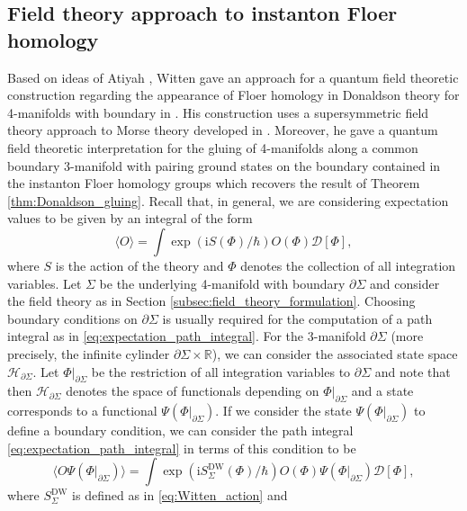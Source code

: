 \documentclass[11pt,colorinlistoftodos]{amsart}
\numberwithin{equation}{subsection}
\theoremstyle{plain}
\theoremstyle{definition}
\theoremstyle{remark}
\newcommand{\R}{\mathbb{R}}
\newcommand{\de}{\partial}
\newcommand{\calH}{\mathcal{H}}
\newcommand{\I}{\mathrm{i}}
\begin{document}
\subsection{Field theory approach to instanton Floer homology}
\label{subsec:field_theory_approach_to_floer_homology}
Based on ideas of Atiyah \cite{Atiyah1987}, Witten gave an approach for a quantum field theoretic construction regarding the appearance of Floer homology in Donaldson theory for 4-manifolds with boundary in \cite{Witten1988a}. His construction uses a supersymmetric field theory approach to Morse theory developed in \cite{Witten1982}. Moreover, he gave a quantum field theoretic interpretation for the gluing of 4-manifolds along a common boundary 3-manifold with pairing ground states on the boundary contained in the instanton Floer homology groups which recovers the result of Theorem \ref{thm:Donaldson_gluing}. 
Recall that, in general, we are considering expectation values to be given by an integral of the form 
\begin{equation}\label{eq:expectation_path_integral}
\langle O\rangle=\int \exp(\I S(\Phi)/\hbar)O(\Phi)\mathscr{D}[\Phi],
\end{equation}
where $S$ is the action of the theory and $\Phi$ denotes the collection of all integration variables. Let $\Sigma$ be the underlying 4-manifold with boundary $\de\Sigma$ and consider the field theory as in Section \ref{subsec:field_theory_formulation}. Choosing boundary conditions on $\de\Sigma$ is usually required for the computation of a path integral as in \eqref{eq:expectation_path_integral}. For the 3-manifold $\de\Sigma$ (more precisely, the infinite cylinder $\de\Sigma\times\R$), we can consider the associated state space $\calH_{\de\Sigma}$. Let $\Phi\vert_{\de\Sigma}$ be the restriction of all integration variables to $\de\Sigma$ and note that then $\calH_{\de\Sigma}$ denotes the space of functionals depending on $\Phi\vert_{\de\Sigma}$ and a state corresponds to a functional $\Psi(\Phi\vert_{\de\Sigma})$.
If we consider the state $\Psi(\Phi\vert_{\de\Sigma})$ to define a boundary condition, we can consider the path integral \eqref{eq:expectation_path_integral} in terms of this condition to be 
\begin{equation}\label{eq:expectation_boundary_condition}
\langle O\Psi(\Phi\vert_{\de\Sigma})\rangle=\int\exp(\I S^\mathrm{DW}_\Sigma(\Phi)/\hbar)O(\Phi)\Psi(\Phi\vert_{\de\Sigma})\mathscr{D}[\Phi],
\end{equation}
where $S^\mathrm{DW}_\Sigma$ is defined as in \eqref{eq:Witten_action} and 
\end{document}
